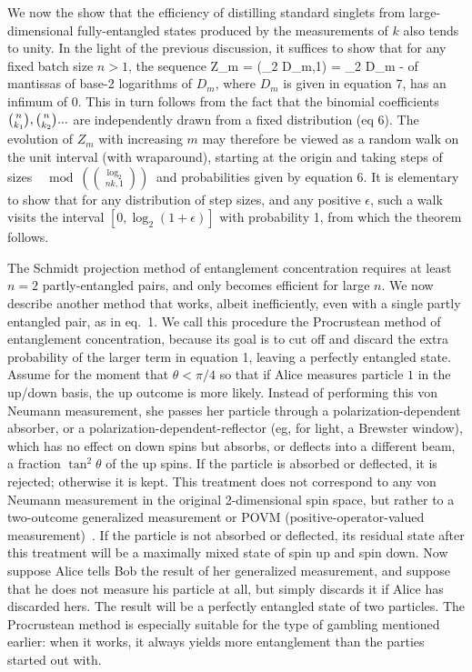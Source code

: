 We now the show that the efficiency of distilling standard
singlets from large-dimensional fully-entangled
states produced by the measurements of $k$ also tends to unity.
In the light of the previous discussion, it suffices to show
that for any fixed batch size $n>1$, the sequence
\beq
Z_m = \mod(\log_2 D_m,1) = \log_2 D_m -\ell
\eeq
of mantissas of base-2 logarithms of $D_m$, where $D_m$ is given
in equation 7, has an infimum of 0.  This in turn follows from
the fact that the binomial coefficients
$\choose{n}{k_1},\choose{n}{k_2}...$ are independently drawn from
a fixed distribution (eq 6).  The evolution of $Z_m$ with
increasing $m$ may therefore be viewed as a random walk on the
unit interval (with wraparound), starting at the origin and
taking steps of sizes $\; \mod(\log_2\choose{n}{k},1) \:$ and
probabilities given by equation 6.  It is elementary to show that
for any distribution of step sizes, and any positive $\epsilon$,
such a walk visits the interval $[0,\log_2(1+\epsilon)]$ with
probability 1, from which the theorem follows.
 
The Schmidt projection method of entanglement concentration requires at
least $n=2$ partly-entangled pairs, and only becomes efficient for large
$n$.  We now describe another method that works, albeit inefficiently,
even with a single partly entangled pair, as in eq.~1.  We call this
procedure the Procrustean method of entanglement concentration, because
its goal is to cut off and discard the extra probability of the larger
term in equation 1, leaving a perfectly entangled state.  Assume for the
moment that $\theta < \pi/4$ so that if Alice measures particle $1$ in
the up/down basis, the up outcome is more likely.  Instead of performing
this von Neumann measurement, she passes her particle through a
polarization-dependent absorber, or a polarization-dependent-reflector
(eg, for light, a Brewster window), which has no effect on down spins
but absorbs, or deflects into a different beam, a fraction
$\tan^2\theta$ of the up spins.  If the particle is absorbed or
deflected, it is rejected; otherwise it is kept. This treatment does not
correspond to any von Neumann measurement in the original 2-dimensional
spin space, but rather to a two-outcome generalized measurement or POVM
(positive-operator-valued measurement)~\cite{Helstrom,Gisin}. If the
particle is not absorbed or deflected, its residual state after this
treatment will be a maximally mixed state of spin up and spin down.  Now
suppose Alice tells Bob the result of her generalized measurement, and
suppose that he does not measure his particle at all, but simply
discards it if Alice has discarded hers.  The result will be a perfectly
entangled state of two particles.  The Procrustean method is especially
suitable for the type of gambling mentioned earlier: when it works,
it always yields more entanglement than the parties started out with.
 

